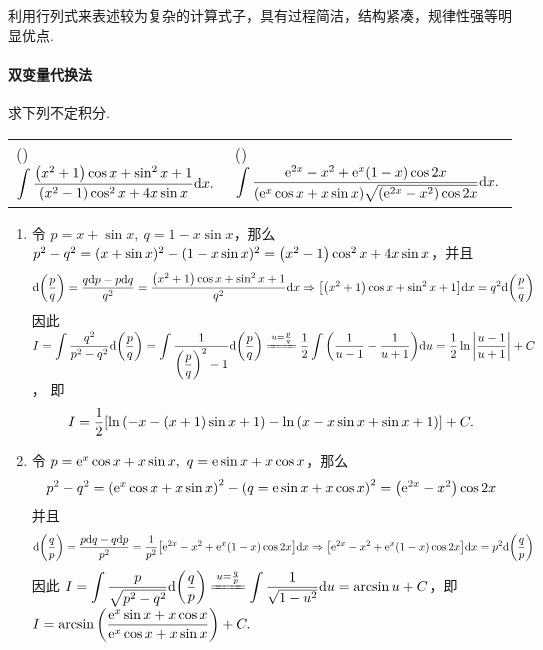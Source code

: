 利用行列式来表述较为复杂的计算式子，具有过程简洁，结构紧凑，规律性强等明显优点.

\paragraph{双变量代换法}

\begin{example}
    求下列不定积分.
    \setcounter{magicrownumbers}{0}
    \begin{table}[H]
        \centering
        \begin{tabular}{l | l}
            (\rownumber{}) $\displaystyle \int\dfrac{\qty(x^2+1)\cos x+\sin^2 x+1}{\qty(x^2-1)\cos^2x+4x\sin x}\dd x.$ & (\rownumber{}) $\displaystyle \int\dfrac{\mathrm{e}^{2x}-x^2+\mathrm{e}^x(1-x)\cos2x}{\qty(\mathrm{e}^x\cos x+x\sin x)\sqrt{\qty(\mathrm{e}^{2x}-x^2)\cos 2x}}\dd x.$
        \end{tabular}
    \end{table}
\end{example}
\begin{solution}
    \begin{enumerate}[label=(\arabic{*})]
        \item 令 $p=x+\sin x,~q=1-x\sin x$，那么 $p^2-q^2=(x+\sin x)^2-(1-x\sin x)^2=\qty(x^2-1)\cos^2x+4x\sin x$，并且
              $$\dd\qty(\dfrac{p}{q})=\dfrac{q\dd p-p\dd q}{q^2}=\dfrac{\qty(x^2+1)\cos x+\sin ^2x+1}{q^2}\dd x\Rightarrow \qty[\qty(x^2+1)\cos x+\sin ^2x+1]\dd x=q^2\dd \qty(\dfrac{p}{q})$$
              因此 $I=\displaystyle\int\dfrac{q^2}{p^2-q^2}\dd \qty(\dfrac{p}{q})=\int\dfrac{1}{\qty(\dfrac{p}{q})^2-1}\dd \qty(\dfrac{p}{q})\xlongequal{u=\frac{p}{q}}\dfrac{1}{2}\int\qty(\dfrac{1}{u-1}-\dfrac{1}{u+1})\dd u=\dfrac{1}{2}\ln\qty|\dfrac{u-1}{u+1}|+C$，
              即 $$I=\dfrac{1}{2}\qty[\ln\qty(-x-(x+1)\sin x+1)-\ln\qty(x-x\sin x+\sin x+1)]+C.$$
        \item 令 $p=\mathrm{e}^x\cos x+x\sin x,~q=\mathrm{e}\sin x+x\cos x$，那么 $$p^2-q^2=\qty(\mathrm{e}^x\cos x+x\sin x)^2-\qty(q=\mathrm{e}\sin x+x\cos x)^2=\qty(\mathrm{e}^{2x}-x^2)\cos 2x$$
              并且
              $$\dd \qty(\dfrac{q}{p})=\dfrac{p\dd q-q\dd p}{p^2}=\dfrac{1}{p^2}\qty[\mathrm{e}^{2x}-x^2+\mathrm{e}^x(1-x)\cos2x]\dd x\Rightarrow \qty[\mathrm{e}^{2x}-x^2+\mathrm{e}^x(1-x)\cos2x]\dd x=p^2\dd \qty(\dfrac{q}{p})$$
              因此 $\displaystyle I=\int\dfrac{p}{\sqrt{p^2-q^2}}\dd \qty(\dfrac{q}{p})\xlongequal{u=\frac{q}{p}}\int\dfrac{1}{\sqrt{1-u^2}}\dd u=\arcsin u+C$，即
              $\displaystyle I=\arcsin\qty(\dfrac{\mathrm{e}^x\sin x+x\cos x}{\mathrm{e}^x\cos x+x\sin x})+C.$
    \end{enumerate}
\end{solution}
